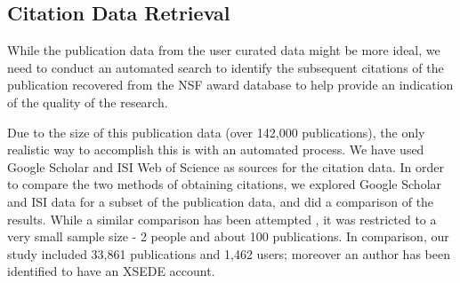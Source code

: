 \documentclass{sig-alternate}
\begin{document}
\subsection{Citation Data Retrieval} 
 
While the publication data from the user curated data might be more ideal, we need to conduct an automated search to identify the subsequent citations of the publication recovered from the NSF award database to help provide an indication of the quality of the research.

Due to the size of this publication data (over 142,000 publications), the only realistic way to accomplish this is with an automated process. We have used Google Scholar and ISI Web of Science as sources for the citation data. In order to compare the two methods of obtaining citations, we explored Google Scholar and ISI data for a subset of the publication data, and did a comparison of the results. While a similar comparison has been attempted \cite{yang2006citation}, it was restricted to a very small sample size - 2 people and about 100 publications. In comparison, our study included 33,861 publications and 1,462 users; moreover an author has been identified to have an XSEDE account.
\end{document}
